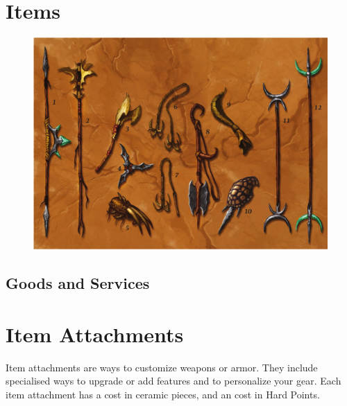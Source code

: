\section{Items}\label{sec:items}

\begin{figure}[!htb]
\centering
\includegraphics[width=0.8\linewidth]{images/weapons.png}
\end{figure}


\hrulefill

\hrulefill


\FloatBarrier
\subsection{Goods and Services}

\hrulefill

\hrulefill


\FloatBarrier
\section{Item Attachments}

Item attachments are ways to customize weapons or armor. They include specialised
ways to upgrade or add features and to personalize your gear. Each item attachment
has a cost in ceramic pieces, and an cost in Hard Points.

